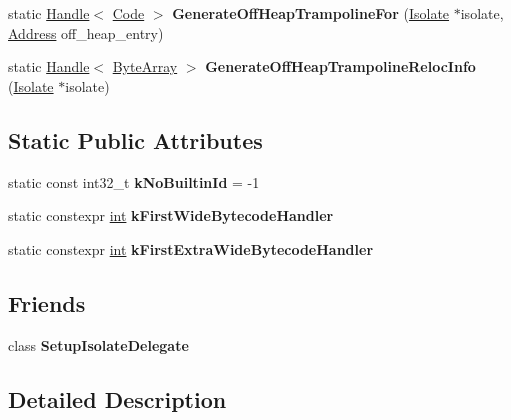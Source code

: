 \begin{DoxyCompactItemize}
\item 
\mbox{\label{classv8_1_1internal_1_1Builtins_af9814b49b2848e669c4bcf55c1b37073}} 
static \mbox{\hyperlink{classv8_1_1internal_1_1Handle}{Handle}}$<$ \mbox{\hyperlink{classv8_1_1internal_1_1Code}{Code}} $>$ {\bfseries Generate\+Off\+Heap\+Trampoline\+For} (\mbox{\hyperlink{classv8_1_1internal_1_1Isolate}{Isolate}} $\ast$isolate, \mbox{\hyperlink{classuintptr__t}{Address}} off\+\_\+heap\+\_\+entry)
\item 
\mbox{\label{classv8_1_1internal_1_1Builtins_ab491f20117c9768ed8bf835ecf277a83}} 
static \mbox{\hyperlink{classv8_1_1internal_1_1Handle}{Handle}}$<$ \mbox{\hyperlink{classv8_1_1internal_1_1ByteArray}{Byte\+Array}} $>$ {\bfseries Generate\+Off\+Heap\+Trampoline\+Reloc\+Info} (\mbox{\hyperlink{classv8_1_1internal_1_1Isolate}{Isolate}} $\ast$isolate)
\end{DoxyCompactItemize}
\subsection*{Static Public Attributes}
\begin{DoxyCompactItemize}
\item 
\mbox{\label{classv8_1_1internal_1_1Builtins_abb01088d2d81b4e91fc1522c963518cb}} 
static const int32\+\_\+t {\bfseries k\+No\+Builtin\+Id} = -\/1
\item 
static constexpr \mbox{\hyperlink{classint}{int}} {\bfseries k\+First\+Wide\+Bytecode\+Handler}
\item 
static constexpr \mbox{\hyperlink{classint}{int}} {\bfseries k\+First\+Extra\+Wide\+Bytecode\+Handler}
\end{DoxyCompactItemize}
\subsection*{Friends}
\begin{DoxyCompactItemize}
\item 
\mbox{\label{classv8_1_1internal_1_1Builtins_a809b0bd6557c908843668329a7333d1f}} 
class {\bfseries Setup\+Isolate\+Delegate}
\end{DoxyCompactItemize}


\subsection{Detailed Description}


